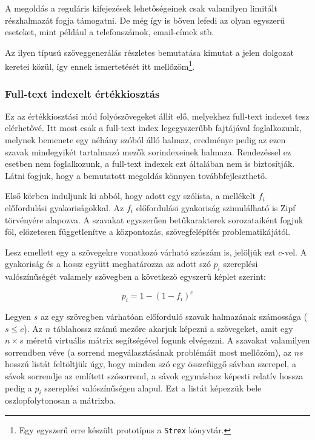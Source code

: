 \documentclass[
    parspace,
    noindent,
    nohyp,
]{elteiktdk}[2023/04/10]
\begin{document}
A megoldás a reguláris kifejezések lehetőségeinek csak valamilyen limitált részhalmazát fogja támogatni.
De még így is bőven lefedi az olyan egyszerű eseteket, mint például a telefonszámok, email-címek stb.

Az ilyen típusú szöveggenerálás részletes bemutatása kimutat a jelen dolgozat keretei közül,
így ennek ismertetését itt mellőzöm\footnote{
  Egy egyszerű erre készült prototípus a \texttt{Strex} könyvtár.
}.

\subsubsection{Full-text indexelt értékkiosztás}

Ez az értékkiosztási mód folyószövegeket állít elő, melyekhez full-text indexet tesz elérhetővé.
Itt most csak a full-text index legegyszerűbb fajtájával foglalkozunk,
melynek bemenete egy néhány szóból álló halmaz,
eredménye pedig az ezen szavak mindegyikét tartalmazó mezők sorindexeinek halmaza.
Rendezéssel ez esetben nem foglalkozunk, a full-text indexek ezt általában nem is biztosítják.
Látni fogjuk, hogy a bemutatott megoldás könnyen továbbfejleszthető.

Első körben induljunk ki abból, hogy adott egy szólista, a mellékelt $f_i$ előfordulási gyakoriságokkal.
Az $f_i$ előfordulási gyakoriság szimulálható is Zipf törvényére alapozva\cite{Zipf1942UnityOfNature}.
A szavakat egyszerűen betűkarakterek sorozataiként fogjuk föl,
előzetesen függetlenítve a központozás, szövegfelépítés problematikájától.

Lesz emellett egy a szövegekre vonatkozó várható szószám is, jelöljük ezt $c$-vel.
A gyakoriság és a hossz együtt meghatározza az adott szó
$p_i$ szereplési valószínűségét valamely szövegben a következő egyszerű képlet szerint:

$$
p_i = 1 - (1 - f_i)^c
$$

Legyen $s$ az egy szövegben várhatóan előforduló szavak halmazának számossága ($s \leq c$).
Az $n$ táblahossz számú mezőre akarjuk képezni a szövegeket,
amit egy $n \times s$ méretű virtuális mátrix segítségével fogunk elvégezni.
A szavakat valamilyen sorrendben véve (a sorrend megválasztásának problémáit most mellőzöm),
az $n s$ hosszú listát feltöltjük úgy, hogy minden szó egy összefüggő sávban szerepel,
a sávok sorrendje az említett szósorrend,
a sávok egymáshoz képesti relatív hossza pedig a $p_i$ szereplési valószínűségen alapul.
Ezt a listát képezzük bele oszlopfolytonosan a mátrixba.
\end{document}
